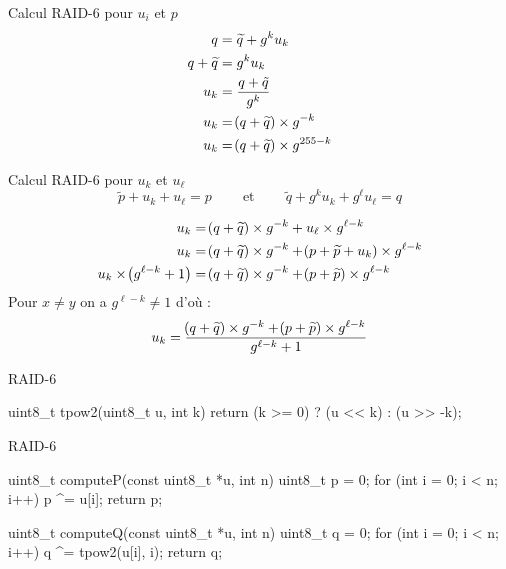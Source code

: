 \documentclass[french,bookmarks,aspectratio=43]{beamer}
\newcommand{\et}{\ \text{et} \ }
\begin{document}
\begin{frame}{Calcul RAID-6 pour $u_i$ et $p$}
    \begin{align*}
        q &= \widetilde{q} + g^ku_k \\
        q + \widetilde{q} &= g^k u_k \\
        u_k &= \dfrac{q + \tilde{q}}{g^k}\\
        u_k &= \!\left(q + \widetilde q\right)\times g^{-k} \\
        u_k &= \!\left(q + \widetilde q\right)\times g^{255-k}
    \end{align*}
\end{frame}

\begin{frame}{Calcul RAID-6 pour $u_k$ et $u_\ell$}
    \[ \widetilde p + u_k + u_\ell = p \qquad\et\qquad \widetilde q + g^k u_k + g^\ell u_\ell = q\]

    \begin{align*}
        u_k &= \!\left(q + \widetilde q\right)\times g^{-k} + u_\ell \times g^{\ell -k}\\
        u_k &= \!\left(q + \widetilde q\right)\times g^{-k} + \!\left(p + \widetilde p + u_k\right) \times g^{\ell -k}\\
        u_k \times \!\left(g^{\ell - k} + 1\right) &= \!\left(q + \widetilde q\right)\times g^{-k} + \!\left(p + \widetilde p\right) \times g^{\ell -k}
    \end{align*}
    Pour $x \neq y$ on a $g^{\ell - k} \neq 1$ d'où :
    \[ u_k = \dfrac{\!\left(q + \widetilde q\right)\times g^{-k} + \!\left(p + \widetilde p\right) \times g^{\ell -k}}{g^{\ell - k} + 1}\]

\end{frame}

\begin{frame}[fragile]{RAID-6}
    \begin{C}
uint8_t tpow2(uint8_t u, int k)
{
    return (k >= 0) ? (u << k) : (u >> -k);
}
    \end{C}
\end{frame}

\begin{frame}[fragile]{RAID-6}
    \begin{C}
uint8_t computeP(const uint8_t *u, int n)
{
    uint8_t p = 0;
    for (int i = 0; i < n; i++) p ^= u[i];
    return p;
}

uint8_t computeQ(const uint8_t *u, int n)
{
    uint8_t q = 0;
    for (int i = 0; i < n; i++)
        q ^= tpow2(u[i], i);
    return q;
}
    \end{C}
\end{frame}
\end{document}
